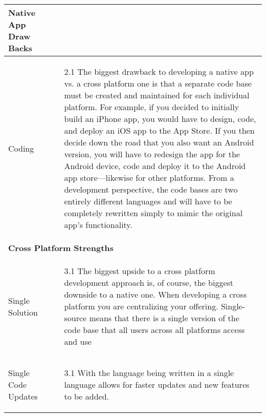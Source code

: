 \begin{center}
\begin{tabularx}{\textwidth}[t]{XX}
\arrayrulecolor{green}\hline
\textbf{\textcolor{myGreen}{Native App Draw Backs}} \\
\hline

Coding &
\begin{minipage}[t]{\linewidth}%
\begin{itemize}
\item[2.1] The biggest drawback to developing a native app vs. a cross platform one is that a separate code base must be created and maintained for each individual platform. For example, if you decided to initially build an iPhone app, you would have to design, code, and deploy an iOS app to the App Store. If you then decide down the road that you also want an Android version, you will have to redesign the app for the Android device, code and deploy it to the Android app store—likewise for other platforms. From a development perspective, the code bases are two entirely different languages and will have to be completely rewritten simply to mimic the original app’s functionality.
\end{itemize}
\end{minipage}\\

\hline
\multicolumn{2}{l}{%
\textbf{\textcolor{myGreen}{Cross Platform Strengths}}} \\
\hline

Single Solution &
\begin{minipage}[t]{\linewidth}%
\begin{itemize}
\item[3.1] The biggest upside to a cross platform development approach is, of course, the biggest downside to a native one. When developing a cross platform you are centralizing your offering. Single-source means that there is a single version of the code base that all users across all platforms access and use
\end{itemize} 
\end{minipage}\\

Single Code Updates &
\begin{minipage}[t]{\linewidth}%
\begin{itemize}
\item[3.1] With the language being written in a single language allows for faster updates and new features to be added.  
\end{itemize} 
\end{minipage}\\




\end{tabularx}
\end{center}
